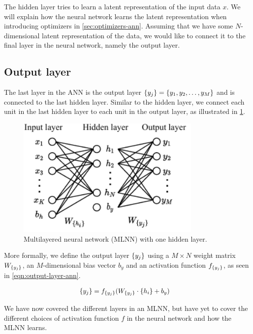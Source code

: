 The hidden layer tries to learn a latent representation of the input data $x$. We will explain how the neural network learns the latent representation when introducing optimizers in \cref{sec:optimizers-ann}. Assuming that we have some $N$-dimensional latent representation of the data, we would like to connect it to the final layer in the neural network, namely the output layer.

\subsection{Output layer}
The last layer in the ANN is the output layer $\left\{ {y}_{j} \right\} = \left\{ y_1, y_2, \ldots, y_M \right\}$ and is connected to the last hidden layer. Similar to the hidden layer, we connect each unit in the last hidden layer to each unit in the output layer, as illustrated in \cref{fig:mlnn-one-hidden}.

\begin{figure}[H]
    \centering
    \includegraphics[width=9cm]{thesis/figures/artificial-neural-network_cropped.pdf}
    \caption{Multilayered neural network (MLNN) with one hidden layer.}
    \label{fig:mlnn-one-hidden}
\end{figure}

More formally, we define the output layer $\left\{ {y}_{j} \right\}$ using a $M \times N$ weight matrix $W_{\left\{ {y}_{j} \right\}}$, an $M$-dimensional bias vector $b_y$ and an activation function $f_{\left\{ {y}_{j} \right\}}$, as seen in \cref{eqn:output-layer-ann}.

\begin{align}
    \label{eqn:output-layer-ann}
    \left\{ {y}_{j} \right\} &= f_{\left\{ {y}_{j} \right\}}(W_{\left\{ {y}_{j} \right\}} \cdot \left\{ {h}_{i} \right\} + b_y)
\end{align}

We have now covered the different layers in an MLNN, but have yet to cover the different choices of activation function $f$ in the neural network and how the MLNN learns.

